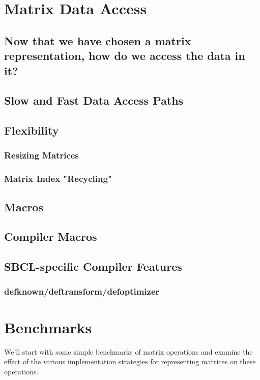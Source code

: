 \documentclass[10pt]{article}
\begin{document}
\clearpage
\section{Matrix Data Access}
\baselineskip12pt
\subsection{Now that we have chosen a matrix representation, how do we
      access the data in it?}
\baselineskip14pt
\baselineskip12pt
\subsection{Slow and Fast Data Access Paths}
\baselineskip14pt
\baselineskip12pt
\subsection{Flexibility}
\baselineskip14pt
\baselineskip12pt
\subsubsection{Resizing Matrices}
\baselineskip14pt
\baselineskip12pt
\subsubsection{Matrix Index "Recycling"}
\baselineskip14pt
\baselineskip12pt
\subsection{Macros}
\baselineskip14pt
\baselineskip12pt
\subsection{Compiler Macros}
\baselineskip14pt
\baselineskip12pt
\subsection{SBCL-specific Compiler Features}
\baselineskip14pt
\baselineskip12pt
\subsubsection{defknown/deftransform/defoptimizer}
\baselineskip14pt
\clearpage
\section{Benchmarks}
We'll start with some simple benchmarks of matrix operations
 and examine the effect of the various implementation strategies for
 representing matrices on these operations.
\end{document}
